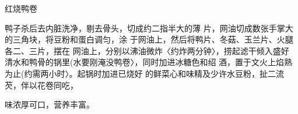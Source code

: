 \begin{recipe}{红烧鸭卷}

\ingredients







\cooking

鸭子杀后去内脏洗净，剔去骨头，切成约二指半大的薄 片，网油切成数张手掌大的三角块，将豆粉和蛋白调匀，涂 于网油上，然后将鸭片、冬菇、玉兰片、火腿各二、三片，摆在 网油上，分别以沸油微炸〈约炸两分钟〉，捞起滤干倾入盛好 清水和鸭骨的锅里(水要刚淹没鸭卷〉，同时加进冰糖色和绍 酒，置于文火上焰熟为止(约需两小时〉。起锅时加进已烧好 的鲜菜心和味精及少许水豆粉，扯二流芡，伴以花卷同吃，

\notes

味浓厚可口，营养丰富。

\end{recipe}

